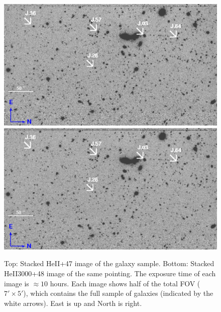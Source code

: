 \documentclass[twocolumn]{aastex62}
\begin{document}
\begin{figure}[ht!]
\centering
\includegraphics[scale=.61]{HEII_final.png}
\includegraphics[scale=.61]{HEII3000_final.png}
\caption{Top: Stacked HeII+47 image of the galaxy sample. Bottom: Stacked HeII3000+48 image of the same pointing. The exposure time of each image is $\approx 10$ hours. Each image shows half of the total FOV ($7' \times 5'$), which contains the full sample of galaxies (indicated by the white arrows). East is up and North is right.
\label{fig:stacked_image}}
\end{figure}
\end{document}
